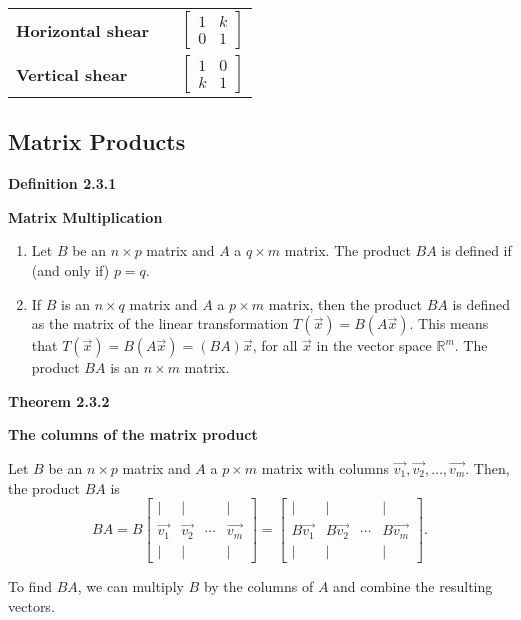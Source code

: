 \begin{tabular}{lll}
\textbf{Horizontal shear} & \qquad{} & $\left[\begin{array}{cc}1&k\\ 0&1\end{array}\right]$\\
\textbf{Vertical shear} & \qquad{} & $\left[\begin{array}{cc}1&0\\ k&1\end{array}\right]$\\
\end{tabular}
\pagebreak

\subsection{Matrix Products}
\textbf{Definition 2.3.1}\\
\par\noindent\textbf{Matrix Multiplication}
\renewcommand{\labelenumi}{\textbf{\alph{enumi}.}}
\begin{enumerate}
\item Let $B$ be an $n\times{}p$ matrix and $A$ a $q\times{}m$ matrix. The product $BA$ is defined if (and only if) $p=q$.
\item If $B$ is an $n\times{}q$ matrix and $A$ a $p\times{}m$ matrix, then the product $BA$ is defined as the matrix of the linear transformation $T(\vec{x})=B(A\vec{x})$. This means that $T(\vec{x})=B(A\vec{x})=(BA)\vec{x}$, for all $\vec{x}$ in the vector space $\mathbb{R}^{m}$. The product $BA$ is an $n\times{}m$ matrix.
\end{enumerate}
\textbf{Theorem 2.3.2}\\
\par\noindent\textbf{The columns of the matrix product}
\par\noindent Let $B$ be an $n\times{}p$ matrix and $A$ a $p\times{}m$ matrix with columns $\vec{v_{1}},\vec{v_{2}},\ldots{},\vec{v_{m}}$. Then, the product $BA$ is
\[BA=B\left[\begin{array}{cccc}|&|&&|\\ \vec{v_{1}}&\vec{v_{2}}&\cdots{}&\vec{v_{m}}\\ |&|&&|\end{array}\right]=\left[\begin{array}{cccc}|&|&&|\\ B\vec{v_{1}}&B\vec{v_{2}}&\cdots{}&B\vec{v_{m}}\\ |&|&&|\end{array}\right].\]
\par\noindent To find $BA$, we can multiply $B$ by the columns of $A$ and combine the resulting vectors.
